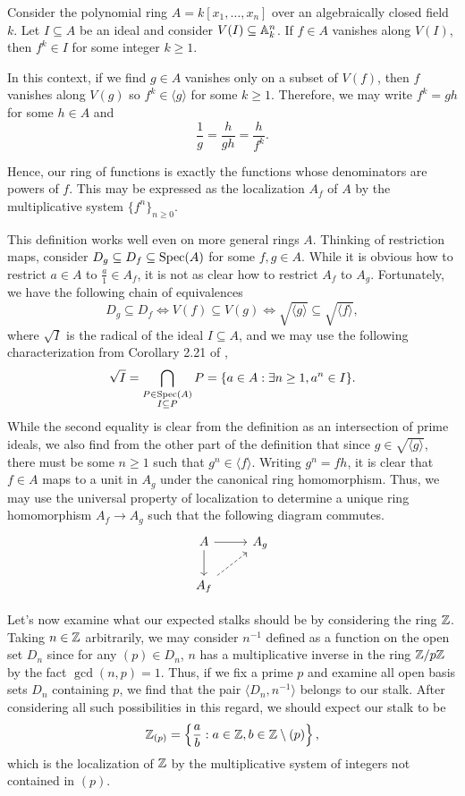 \begin{theorem}
    Consider the polynomial ring $A = k[x_1, \ldots, x_n]$ over an algebraically closed field $k$.
    Let $I \subseteq A$ be an ideal and consider $V(I) \subseteq \mathbb{A}_k^n$.
    If $f \in A$ vanishes along $V(I)$, then $f^k \in I$ for some integer $k \geq 1$. 
\end{theorem}

In this context, if we find $g \in A$ vanishes only on a subset of $V(f)$,
then $f$ vanishes along $V(g)$ so $f^k \in \langle g \rangle$ for some $k \geq 1$. 
Therefore, we may write $f^k = gh$ for some $h \in A$ and
\[
    \frac{1}{g} = \frac{h}{gh} = \frac{h}{f^k}.
\]

Hence, our ring of functions is exactly the functions whose denominators are powers of $f$.
This may be expressed as the localization $A_f$ of $A$ by the multiplicative system $\{ f^n \}_{n \geq 0}$.

This definition works well even on more general rings $A$.
Thinking of restriction maps, consider $D_g \subseteq D_f \subseteq {\rm Spec}(A)$ for some $f, g \in A$.
While it is obvious how to restrict $a \in A$ to $\frac{a}{1} \in A_f$,
it is not as clear how to restrict $A_f$ to $A_g$.
Fortunately,
we have the following chain of equivalences
\[
    D_g \subseteq D_f 
    \iff V(f) \subseteq V(g)
    \iff \sqrt{\langle g \rangle} \subseteq \sqrt{\langle f \rangle},
\]
where $\sqrt{I}$ is the radical of the ideal $I \subseteq A$,
and we may use the following characterization from Corollary 2.21 of \cite{Eisenbud_2013},
\[
    \sqrt{I} 
    = \bigcap_{\substack{
        P \in {\rm Spec}(A) \\
        I \subseteq P
    }} P
    = \{ a \in A : \exists n \geq 1, a^n \in I \}.
\]
While the second equality is clear from the definition as an intersection of prime ideals,
we also find from the other part of the definition that since $g \in \sqrt{\langle g \rangle}$, 
there must be some $n \geq 1$ such that $g^n \in \langle f \rangle$.
Writing $g^n = fh$, it is clear that $f \in A$ maps to a unit in $A_g$ under the canonical ring homomorphism. 
Thus, we may use the universal property of localization to determine a unique ring homomorphism $A_f \to A_g$ such that the following diagram commutes.
\[
    \begin{tikzcd}
        A \arrow[r] \arrow[d] & A_g \\
        A_f \arrow[ur, dashed]
    \end{tikzcd}
\]

Let's now examine what our expected stalks should be by considering the ring $\mathbb{Z}$.
Taking $n \in \mathbb{Z}$ arbitrarily, we may consider $n^{-1}$ defined as a function on the open set $D_n$ since for any $(p) \in D_n$,
$n$ has a multiplicative inverse in the ring $\mathbb{Z}/p\mathbb{Z}$ by the fact $\gcd(n, p) = 1$.
Thus, if we fix a prime $p$ and examine all open basis sets $D_n$ containing $p$,
we find that the pair $\langle D_n, n^{-1} \rangle$ belongs to our stalk.
After considering all such possibilities in this regard, we should expect our stalk to be
\[
    \mathbb{Z}_{(p)} = \left\{
        \frac{a}{b} : a \in \mathbb{Z}, b \in \mathbb{Z} \setminus (p)
    \right\},
\]
which is the localization of $\mathbb{Z}$ by the multiplicative system of integers not contained in $(p)$.


